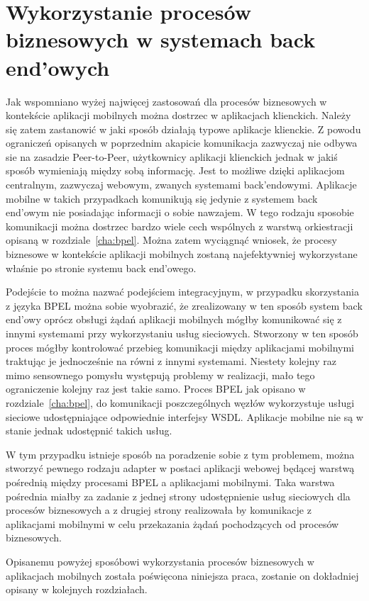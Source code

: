 
\section{Wykorzystanie procesów biznesowych w systemach back end'owych}
\label{sec:integracjaProcesówZAplikacjamiMobilnymi}

Jak wspomniano wyżej najwięcej zastosowań dla procesów biznesowych w kontekście aplikacji mobilnych można dostrzec w aplikacjach klienckich. Należy się zatem zastanowić w jaki sposób działają typowe aplikacje klienckie. Z powodu ograniczeń opisanych w poprzednim akapicie komunikacja zazwyczaj nie odbywa sie na zasadzie Peer-to-Peer, użytkownicy aplikacji klienckich jednak w jakiś sposób wymieniają między sobą informację. Jest to możliwe dzięki aplikacjom centralnym, zazwyczaj webowym, zwanych systemami back'endowymi. Aplikacje mobilne w takich przypadkach komunikują się jedynie z systemem back end'owym nie posiadając informacji o sobie nawzajem. W tego rodzaju sposobie komunikacji można dostrzec bardzo wiele cech wspólnych z warstwą orkiestracji opisaną w rozdziale~\ref{cha:bpel}. Można zatem wyciągnąć wniosek, że procesy biznesowe w kontekście aplikacji mobilnych zostaną najefektywniej wykorzystane właśnie po stronie systemu back end'owego. 

Podejście to można nazwać podejściem integracyjnym, w przypadku skorzystania z języka BPEL można sobie wyobrazić, że zrealizowany w ten sposób system back end'owy oprócz obsługi żądań aplikacji mobilnych mógłby komunikować się z innymi systemami przy wykorzystaniu usług sieciowych. Stworzony w ten sposób proces mógłby kontrolować przebieg komunikacji między aplikacjami mobilnymi traktując je jednocześnie na równi z innymi systemami.  Niestety kolejny raz mimo sensownego pomysłu występują problemy w realizacji, mało tego ograniczenie kolejny raz jest takie samo. Proces BPEL jak opisano w rozdziale~\ref{cha:bpel}, do komunikacji poszczególnych węzłów wykorzystuje usługi sieciowe udostępniające odpowiednie interfejsy WSDL. Aplikacje mobilne nie są w stanie jednak udostępnić takich usług. 

W tym przypadku istnieje sposób na poradzenie sobie z tym problemem, można stworzyć pewnego rodzaju adapter w postaci aplikacji webowej będącej warstwą pośrednią między procesami BPEL a aplikacjami mobilnymi. Taka warstwa pośrednia miałby za zadanie z jednej strony udostępnienie usług sieciowych dla procesów biznesowych a z drugiej strony realizowała by komunikacje z aplikacjami mobilnymi w celu przekazania żądań pochodzących od procesów biznesowych. 

Opisanemu powyżej sposóbowi wykorzystania procesów biznesowych w aplikacjach mobilnych została poświęcona niniejsza praca, zostanie on dokładniej opisany w kolejnych rozdziałach.
